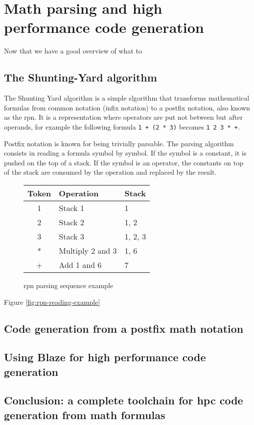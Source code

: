 \documentclass[../main]{subfiles}
\begin{document}
\section{
  Math parsing and high performance code generation
}

Now that we have a good overview of what to

\subsection{
  The Shunting-Yard algorithm
}

The Shunting Yard algorithm \cite{shunting-yard} is a simple slgorithm
that transforms mathematical formulas from common notation (\ie infix notation)
to a postfix notation, also known as the \gls{rpn}. It is a representation where
operators are put not between but after operands, for example the following
formula \lstinline{1 + (2 * 3)} becomes \lstinline{1 2 3 * +}.

Postfix notation is known for being trivially parsable.
The parsing algorithm consists in reading a formula symbol by symbol.
If the symbol is a constant, it is pushed on the top of a stack.
If the symbol is an operator, the constants on top of the stack are consumed
by the operation and replaced by the result.

\begin{figure}
\centering
\begin{tabular}{| c | l | l |}
\hline
Token & Operation         & Stack \\
\hline
1     & Stack 1           & 1 \\
2     & Stack 2           & 1, 2 \\
3     & Stack 3           & 1, 2, 3 \\
*     & Multiply 2 and 3  & 1, 6 \\
+     & Add 1 and 6       & 7 \\
\hline
\end{tabular}
\caption{\gls{rpn} parsing sequence example}
\label{fig:rpn-parsing-example}
\end{figure}

Figure \ref{fig:rpn-reading-example}

\subsection{
  Code generation from a postfix math notation
}

\subsection{
  Using Blaze for high performance code generation
}


\subsection{
  Conclusion: a complete toolchain for \acrlong{hpc} code generation from math formulas
}
\end{document}
